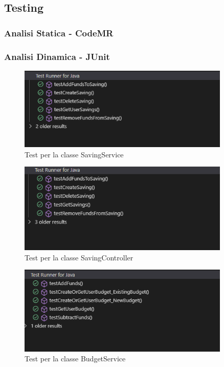 \subsection{Testing}

\subsubsection{Analisi Statica - CodeMR}
\subsubsection{Analisi Dinamica - JUnit}

\begin{figure}[H]
    \centering
    \includegraphics[width=0.9\textwidth]{images/SavingServiceTest.png}
    \caption{Test per la classe SavingService}
    \label{fig:SavingServiceTest}
\end{figure}

\begin{figure}[H]
    \centering
    \includegraphics[width=0.9\textwidth]{images/SavingControllerTest.png}
    \caption{Test per la classe SavingController}
    \label{fig:SavingControllerTest}
\end{figure}

\begin{figure}[H]
    \centering
    \includegraphics[width=0.9\textwidth]{images/BudgetServiceTest.png}
    \caption{Test per la classe BudgetService}
    \label{fig:BudgetServiceTest}
\end{figure}

